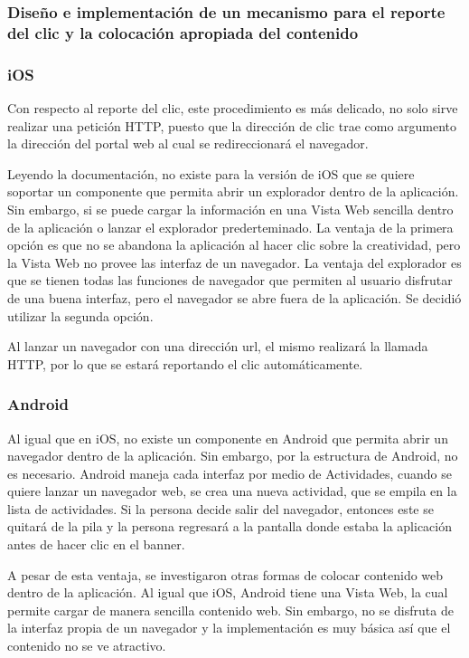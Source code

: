 \subsubsection{Diseño e implementación de un mecanismo para el reporte del clic
y la colocación apropiada del contenido}


\subsubsection*{iOS}

Con respecto al reporte del clic, este procedimiento es más delicado,
no solo sirve realizar una petición HTTP, puesto que la dirección
de clic trae como argumento la dirección del portal web al cual se
redireccionará el navegador.

Leyendo la documentación, no existe para la versión de iOS que se
quiere soportar un componente que permita abrir un explorador dentro
de la aplicación. Sin embargo, si se puede cargar la información en
una Vista Web sencilla dentro de la aplicación o lanzar el explorador
prederteminado. La ventaja de la primera opción es que no se abandona
la aplicación al hacer clic sobre la creatividad, pero la Vista Web
no provee las interfaz de un navegador. La ventaja del explorador
es que se tienen todas las funciones de navegador que permiten al
usuario disfrutar de una buena interfaz, pero el navegador se abre
fuera de la aplicación. Se decidió utilizar la segunda opción. 

Al lanzar un navegador con una dirección url, el mismo realizará la
llamada HTTP, por lo que se estará reportando el clic automáticamente.


\subsubsection*{Android}

Al igual que en iOS, no existe un componente en Android que permita
abrir un navegador dentro de la aplicación. Sin embargo, por la estructura
de Android, no es necesario. Android maneja cada interfaz por medio
de Actividades, cuando se quiere lanzar un navegador web, se crea
una nueva actividad, que se empila en la lista de actividades. Si
la persona decide salir del navegador, entonces este se quitará de
la pila y la persona regresará a la pantalla donde estaba la aplicación
antes de hacer clic en el banner. 

A pesar de esta ventaja, se investigaron otras formas de colocar contenido
web dentro de la aplicación. Al igual que iOS, Android tiene una Vista
Web, la cual permite cargar de manera sencilla contenido web. Sin
embargo, no se disfruta de la interfaz propia de un navegador y la
implementación es muy básica así que el contenido no se ve atractivo.

